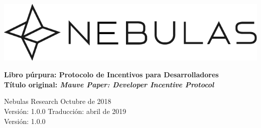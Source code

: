 \documentclass[12pt]{article}
\begin{document}
\pagestyle{empty}

\pagecolor{\pcolor}

\begin{titlepage}
  \begin{center}
    \vspace*{5.5cm}
    \includegraphics[scale=0.5]{../common/Nebulas.png}
    \vspace{0.5cm}

    \textbf{\huge{Libro púrpura: Protocolo de Incentivos para Desarrolladores}}\\
    \textbf{Título original: \textit{Mauve Paper: Developer Incentive Protocol}}

    \vspace{0.5cm}
    Nebulas Research
    \vfill
    Octubre de 2018\\
    Versión: 1.0.0
    \vfill
    Traducción: abril de 2019\\
    Versión: 1.0.0
    \textbf{}
  \end{center}

\end{titlepage}
\setcounter{page}{0}
\tableofcontents
\newpage
\setcounter{page}{1}
\pagestyle{fancy}
\vspace*{0.01cm}

\newpage
\begin{appendices}
\end{appendices}
\end{document}
